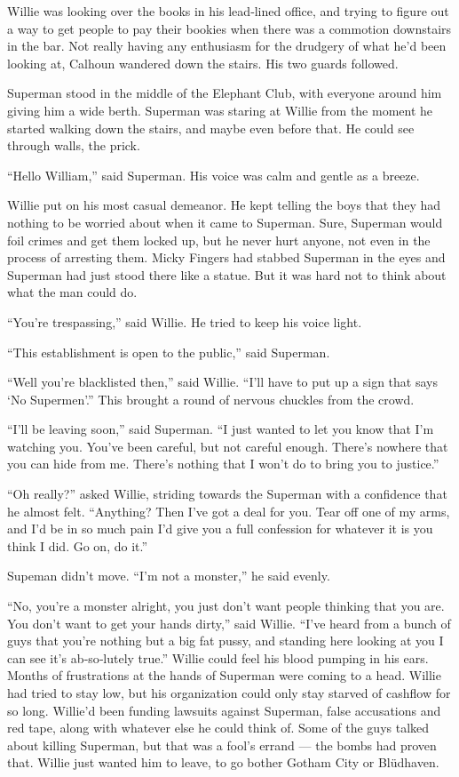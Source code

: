 Willie was looking over the books in his lead‐lined office, and trying
to figure out a way to get people to pay their bookies when there was a
commotion downstairs in the bar. Not really having any enthusiasm for
the drudgery of what he'd been looking at, Calhoun wandered down the
stairs. His two guards followed.

Superman stood in the middle of the Elephant Club, with everyone around
him giving him a wide berth. Superman was staring at Willie from the
moment he started walking down the stairs, and maybe even before that.
He could see through walls, the prick.

``Hello William,'' said Superman. His voice was calm and gentle as a
breeze.

Willie put on his most casual demeanor. He kept telling the boys that
they had nothing to be worried about when it came to Superman. Sure,
Superman would foil crimes and get them locked up, but he never hurt
anyone, not even in the process of arresting them. Micky Fingers had
stabbed Superman in the eyes and Superman had just stood there like a
statue. But it was hard not to think about what the man could do.

``You're trespassing,'' said Willie. He tried to keep his voice light.

``This establishment is open to the public,'' said Superman.

``Well you're blacklisted then,'' said Willie. ``I'll have to put up a
sign that says `No Supermen'.'' This brought a round of nervous chuckles
from the crowd.

``I'll be leaving soon,'' said Superman. ``I just wanted to let you know
that I'm watching you. You've been careful, but not careful enough.
There's nowhere that you can hide from me. There's nothing that I won't
do to bring you to justice.''

``Oh really?'' asked Willie, striding towards the Superman with a
confidence that he almost felt. ``Anything? Then I've got a deal for
you. Tear off one of my arms, and I'd be in so much pain I'd give you a
full confession for whatever it is you think I did. Go on, do it.''

Supeman didn't move. ``I'm not a monster,'' he said evenly.

``No, you're a monster alright, you just don't want people thinking that
you are. You don't want to get your hands dirty,'' said Willie. ``I've
heard from a bunch of guys that you're nothing but a big fat pussy, and
standing here looking at you I can see it's ab‐so‐lutely true.'' Willie
could feel his blood pumping in his ears. Months of frustrations at the
hands of Superman were coming to a head. Willie had tried to stay low,
but his organization could only stay starved of cashflow for so long.
Willie'd been funding lawsuits against Superman, false accusations and
red tape, along with whatever else he could think of. Some of the guys
talked about killing Superman, but that was a fool's errand --- the
bombs had proven that. Willie just wanted him to leave, to go bother
Gotham City or Blüdhaven.

